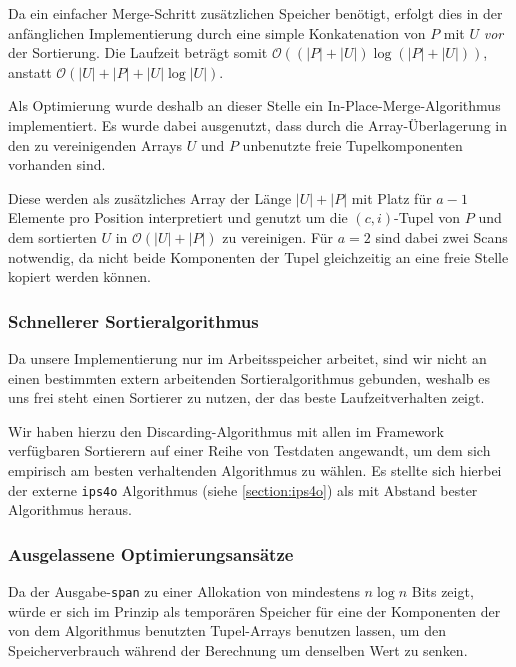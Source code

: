 Da ein einfacher Merge-Schritt zusätzlichen Speicher benötigt, erfolgt dies in der anfänglichen Implementierung durch eine simple Konkatenation von $P$ mit $U$ \textit{vor} der Sortierung. Die Laufzeit beträgt somit $\mathcal{O}( (|P| + |U|) \log (|P| + |U|))$, anstatt $\mathcal{O}( |U| + |P| + |U| \log |U|)$.

Als Optimierung wurde deshalb an dieser Stelle ein In-Place-Merge-Algorithmus implementiert. Es wurde dabei ausgenutzt, dass durch die Array-Überlagerung in den zu vereinigenden Arrays $U$ und $P$ unbenutzte freie Tupelkomponenten vorhanden sind.

Diese werden als zusätzliches Array der Länge $|U| + |P|$ mit Platz für $a - 1$ Elemente pro Position interpretiert und genutzt um die $(c, i)$-Tupel von $P$ und dem sortierten $U$ in $\mathcal{O}( |U| + |P|)$ zu vereinigen. Für $a=2$ sind dabei zwei Scans notwendig, da nicht beide Komponenten der Tupel gleichzeitig an eine freie Stelle kopiert werden können.

\subsubsection{Schnellerer Sortieralgorithmus}

Da unsere Implementierung nur im Arbeitsspeicher arbeitet, sind wir nicht an einen bestimmten extern arbeitenden Sortieralgorithmus gebunden, weshalb es uns frei steht einen Sortierer zu nutzen, der das beste Laufzeitverhalten zeigt.

Wir haben hierzu den Discarding-Algorithmus mit allen im Framework verfügbaren Sortierern auf einer Reihe von Testdaten angewandt, um dem sich empirisch am besten verhaltenden Algorithmus zu wählen. Es stellte sich hierbei der externe \texttt{ips4o} Algorithmus (siehe \cref{section:ips4o}) als mit Abstand bester Algorithmus heraus.


\subsubsection{Ausgelassene Optimierungsansätze}

Da der Ausgabe-\texttt{span} zu einer Allokation von mindestens $n \log n$ Bits zeigt, würde er sich im Prinzip als temporären Speicher für eine der Komponenten der von dem Algorithmus benutzten Tupel-Arrays benutzen lassen, um den Speicherverbrauch während der Berechnung um denselben Wert zu senken. 

